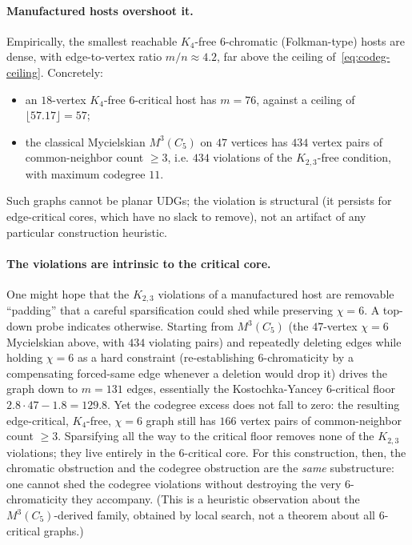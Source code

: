 \documentclass[11pt]{article}
\theoremstyle{definition}
\newcommand{\chrom}{\chi}
\begin{document}
\paragraph{Manufactured hosts overshoot it.} Empirically, the smallest reachable
$K_4$-free $6$-chromatic (Folkman-type) hosts are dense, with edge-to-vertex
ratio $m/n \approx 4.2$, far above the ceiling
of~\eqref{eq:codeg-ceiling}. Concretely:
\begin{itemize}
  \item an $18$-vertex $K_4$-free $6$-critical host has $m = 76$, against a
        ceiling of $\lfloor 57.17 \rfloor = 57$;
  \item the classical Mycielskian $M^3(C_5)$ on $47$ vertices has $434$ vertex
        pairs of common-neighbor count $\ge 3$, i.e. $434$ violations of the
        $K_{2,3}$-free condition, with maximum codegree $11$.
\end{itemize}
Such graphs cannot be planar UDGs; the violation is structural (it persists for
edge-critical cores, which have no slack to remove), not an artifact of any
particular construction heuristic.

\paragraph{The violations are intrinsic to the critical core.} One might hope that
the $K_{2,3}$ violations of a manufactured host are removable ``padding'' that a
careful sparsification could shed while preserving $\chrom = 6$. A top-down probe
indicates otherwise. Starting from $M^3(C_5)$ (the $47$-vertex $\chrom = 6$
Mycielskian above, with $434$ violating pairs) and repeatedly deleting edges while
holding $\chrom = 6$ as a hard constraint (re-establishing $6$-chromaticity by a
compensating forced-same edge whenever a deletion would drop it) drives the graph
down to $m = 131$ edges, essentially the Kostochka-Yancey $6$-critical floor
$2.8 \cdot 47 - 1.8 = 129.8$. Yet the codegree excess does not fall to zero: the
resulting edge-critical, $K_4$-free, $\chrom = 6$ graph still has $166$ vertex pairs
of common-neighbor count $\ge 3$. Sparsifying all the way to the critical floor
removes none of the $K_{2,3}$ violations; they live entirely in the $6$-critical
core. For this construction, then, the chromatic obstruction and the codegree
obstruction are the \emph{same} substructure: one cannot shed the codegree
violations without destroying the very $6$-chromaticity they accompany. (This is a
heuristic observation about the $M^3(C_5)$-derived family, obtained by local search,
not a theorem about all $6$-critical graphs.)
\end{document}
